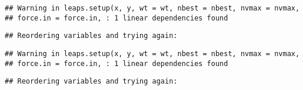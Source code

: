 \documentclass[]{article}
\newenvironment{Shaded}{\begin{snugshade}}{\end{snugshade}}
\newcommand{\DataTypeTok}[1]{\textcolor[rgb]{0.13,0.29,0.53}{#1}}
\newcommand{\DecValTok}[1]{\textcolor[rgb]{0.00,0.00,0.81}{#1}}
\newcommand{\KeywordTok}[1]{\textcolor[rgb]{0.13,0.29,0.53}{\textbf{#1}}}
\newcommand{\NormalTok}[1]{#1}
\newcommand{\OperatorTok}[1]{\textcolor[rgb]{0.81,0.36,0.00}{\textbf{#1}}}
\newcommand{\StringTok}[1]{\textcolor[rgb]{0.31,0.60,0.02}{#1}}
\begin{document}
\begin{Shaded}
\end{Shaded}

\begin{verbatim}
## Warning in leaps.setup(x, y, wt = wt, nbest = nbest, nvmax = nvmax,
## force.in = force.in, : 1 linear dependencies found
\end{verbatim}

\begin{verbatim}
## Reordering variables and trying again:
\end{verbatim}

\begin{verbatim}
## Warning in leaps.setup(x, y, wt = wt, nbest = nbest, nvmax = nvmax,
## force.in = force.in, : 1 linear dependencies found
\end{verbatim}

\begin{verbatim}
## Reordering variables and trying again:
\end{verbatim}
\end{document}
